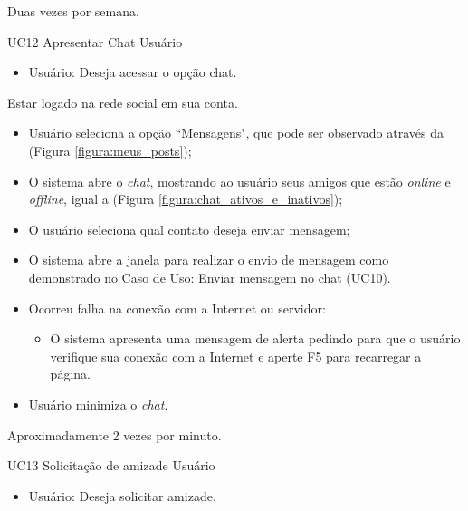 {Duas vezes por semana.}
{

}
\casoDeUso
{UC12}
{Apresentar Chat}
{Usuário}
{
\begin{itemize}
	\item Usuário: Deseja acessar o opção chat.	
\end{itemize}

}
{Estar logado na rede social em sua conta.}
{}
{
\begin{itemize}
	\item Usuário seleciona a opção ``Mensagens", que pode ser observado através da (Figura \ref{figura:meus_posts});	
	\item O sistema abre o \textit{chat}, mostrando ao usuário seus amigos que estão \textit{online}  e \textit{offline}, igual a (Figura \ref{figura:chat_ativos_e_inativos});	
	\item O usuário seleciona qual contato deseja enviar mensagem;
	\item O sistema abre a janela para realizar o envio de mensagem como demonstrado no Caso de Uso: Enviar mensagem no chat (UC10).  
					
\end{itemize}
}
{
\begin{itemize}
	\item Ocorreu falha na conexão com a Internet ou servidor:
	\begin{itemize}
	\item O sistema apresenta uma mensagem de alerta pedindo para que o usuário verifique sua conexão com a Internet e aperte F5 para recarregar a página. 	
	\end{itemize}
	\item Usuário minimiza o \textit{chat}. 
\end{itemize}
}
{Aproximadamente 2 vezes por minuto.}
{

}
\casoDeUso
{UC13}
{Solicitação de amizade}
{Usuário}
{
\begin{itemize}
	\item Usuário: Deseja solicitar amizade.
\end{itemize}

}
